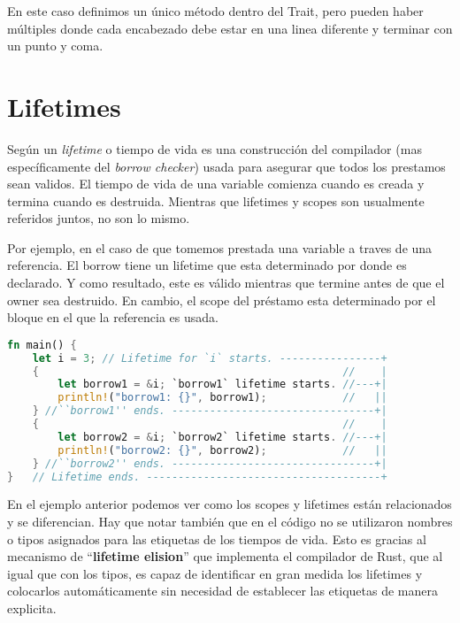 En este caso definimos un único método dentro del Trait, pero pueden haber múltiples donde cada encabezado debe estar en una linea diferente y terminar con un punto y coma.

\section{Lifetimes}

Según  un \textit{lifetime} o tiempo de vida es una construcción del compilador (mas específicamente del \textit{borrow checker}) usada para asegurar que todos los prestamos sean validos. El tiempo de vida de una variable comienza cuando es creada y termina cuando es destruida. Mientras que lifetimes y scopes son usualmente referidos juntos, no son lo mismo.

Por ejemplo, en el caso de que tomemos prestada una variable a traves de una referencia. El borrow tiene un lifetime que esta determinado por donde es declarado. Y como resultado, este es válido mientras que termine antes de que el owner sea destruido. En cambio, el scope del préstamo esta determinado por el bloque en el que la referencia es usada.

\begin{lstlisting}[language=Rust]
fn main() {
    let i = 3; // Lifetime for `i` starts. ----------------+
    {                                                //    |
        let borrow1 = &i; `borrow1` lifetime starts. //---+|
        println!("borrow1: {}", borrow1);            //   ||
    } //``borrow1'' ends. --------------------------------+|
    {                                                //    |
        let borrow2 = &i; `borrow2` lifetime starts. //---+|
        println!("borrow2: {}", borrow2);            //   ||
    } //``borrow2'' ends. --------------------------------+|
}   // Lifetime ends. -------------------------------------+

\end{lstlisting}

En el ejemplo anterior podemos ver como los scopes y lifetimes están relacionados y se diferencian. Hay que notar también que en el código no se utilizaron nombres o tipos asignados para las etiquetas de los tiempos de vida. Esto es gracias al mecanismo de ``\textbf{lifetime elision}'' que implementa el compilador de Rust, que al igual que con los tipos, es capaz de identificar en gran medida los lifetimes y colocarlos automáticamente sin necesidad de establecer las etiquetas de manera explicita.

